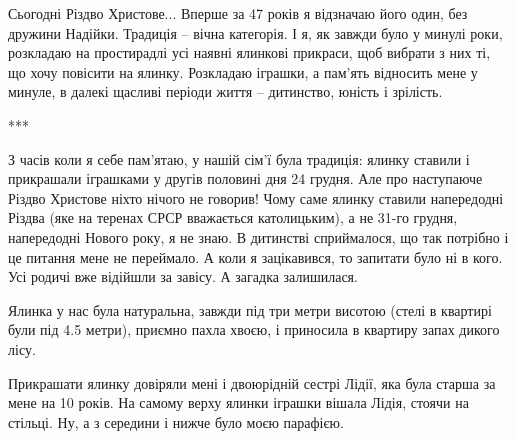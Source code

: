  
 
 
 
 
Сьогодні Різдво Христове... Вперше за 47 років я відзначаю його один, без дружини
Надійки. Традиція – вічна категорія. І я, як завжди було у минулі роки,
розкладаю на простирадлі усі наявні ялинкові прикраси, щоб вибрати з них ті, що
хочу повісити на ялинку. Розкладаю іграшки, а пам’ять відносить мене у минуле,
в далекі щасливі періоди життя – дитинство, юність і зрілість.

***

З часів коли я себе пам'ятаю, у нашій сім'ї була традиція: ялинку ставили і
прикрашали іграшками у другів половині дня 24 грудня. Але про наступаюче Різдво
Христове ніхто нічого не говорив! Чому саме ялинку ставили напередодні Різдва
(яке на теренах СРСР вважається католицьким), а не 31-го грудня, напередодні
Нового року, я не знаю. В дитинстві сприймалося, що так потрібно і це питання
мене не переймало. А коли я зацікавився, то запитати було ні в кого. Усі родичі
вже відійшли за завісу. А загадка залишилася. 






Ялинка у нас була натуральна, завжди під три метри висотою (стелі в квартирі
були під 4.5 метри), приємно пахла хвоєю, і приносила в квартиру запах дикого
лісу. 

Прикрашати ялинку довіряли мені і двоюрідній сестрі Лідії, яка була старша за
мене на 10 років. На самому верху ялинки іграшки вішала Лідія, стоячи на
стільці. Ну, а з середини і нижче було моєю парафією.


